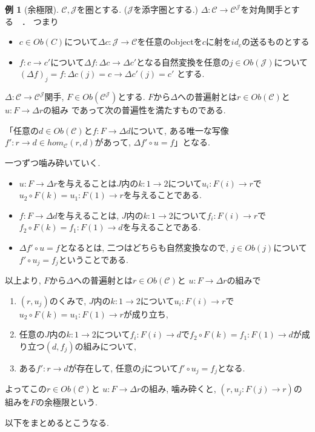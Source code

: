 \documentclass[dvipdfmx,a4paper,11pt]{article}
\theoremstyle{definition}
\newtheorem{exa}[thm]{例}
\begin{document}
\begin{exa}[余極限]
$\mathcal{C}, \mathcal{J}$を圏とする. ($\mathcal{J}$を添字圏とする.)
$\Delta : \mathcal{C} \to \mathcal{C}^{\mathcal{J}}$を対角関手とする　．
つまり
\begin{itemize}
\item$c \in Ob(C)$について$\Delta c : \mathcal{J} \to \mathcal{C}$を任意のobjectを$c$に射を$id_c$の送るものとする
\item  $f: c \to c'$について$\Delta f : \Delta c \to \Delta c'$となる自然変換を任意の$j \in Ob(\mathcal{J})$について$(\Delta f)_{j}=f : \Delta c(j) = c \to \Delta c' (j)=c' $ とする.
\end{itemize}

$\Delta : \mathcal{C} \to \mathcal{C}^{\mathcal{J}}$関手, 
$F \in Ob(\mathcal{C}^{\mathcal{J}})$とする.
$F$から$\Delta $への普遍射とは$r \in Ob(\mathcal{C})$と $u: F \to \Delta r$の組み
であって次の普遍性を満たすものである.

「任意の$d \in Ob(\mathcal{C})$と$f : F\to \Delta d$について, ある唯一な写像$f' : r \to d \in hom_{\mathcal{C}}(r,d)$があって, $\Delta f' \circ u =f$」となる.

一つずつ噛み砕いていく.
\begin{itemize}
\item $u: F \to \Delta r$を与えることは$J$内の$k : 1\to 2$について$u_i : F(i) \to r$で$u_2 \circ F(k) = u_1 : F(1) \to r$を与えることである.
\item $f : F\to \Delta d$を与えることは, $J$内の$k : 1\to 2$について$f_i : F(i) \to r$で$f_2 \circ F(k) = f_1 : F(1) \to d$を与えることである.
\item  $\Delta f' \circ u =f$となるとは, 二つはどちらも自然変換なので, $j \in Ob(j)$について$f' \circ u_j = f_j$ということである.
\end{itemize}
以上より, $F$から$\Delta $への普遍射とは$r \in Ob(\mathcal{C})$と $u: F \to \Delta r$の組みで
\begin{enumerate}
\item $(r, u_j)$のくみで, $J$内の$k : 1\to 2$について$u_i : F(i) \to r$で$u_2 \circ F(k) = u_1 : F(1) \to r$が成り立ち, 
\item 任意の$J$内の$k : 1\to 2$について$f_i : F(i) \to d$で$f_2 \circ F(k) = f_1 : F(1) \to d$が成り立つ$(d, f_j)$の組みについて,
\item ある$f' : r \to d$が存在して, 任意の$j$について$f' \circ u_j = f_j$となる.
\end{enumerate}
よってこの$r \in Ob(\mathcal{C})$と $u: F \to \Delta r$の組み, 噛み砕くと,
$(r, u_j : F(j) \to r)$の組みを$F$の余極限という. 
\end{exa}
以下をまとめるとこうなる. 
\end{document}
